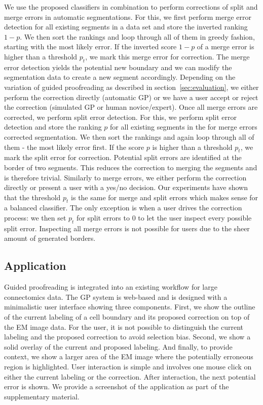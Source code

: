 We use the proposed classifiers in combination to perform corrections of split and merge errors in automatic segmentations. For this, we first perform merge error detection for all existing segments in a data set and store the inverted ranking $1-p$. We then sort the rankings and loop through all of them in greedy fashion, starting with the most likely error. If the inverted score $1-p$ of a merge error is higher than a threshold $p_t$, we mark this merge error for correction. The merge error detection yields the potential new boundary and we can modify the segmentation data to create a new segment accordingly. Depending on the variation of guided proofreading as described in section~\ref{sec:evaluation}, we either perform the correction directly (automatic GP) or we have a user accept or reject the correction (simulated GP or human novice/expert).
Once all merge errors are corrected, we perform split error detection. For this, we perform split error detection and store the ranking $p$ for all existing segments in the for merge errors corrected segmentation. We then sort the rankings and again loop through all of them - the most likely error first. If the score $p$ is higher than a threshold $p_t$, we mark the split error for correction. Potential split errors are identified at the border of two segments. This reduces the correction to merging the segments and is therefore trivial. Similarly to merge errors, we either perform the correction directly or present a user with a yes/no decision. Our experiments have shown that the threshold $p_t$ is the same for merge and split errors which makes sense for a balanced classifier. The only exception is when a user drives the correction process: we then set $p_t$ for split errors to 0 to let the user inspect every possible split error. Inspecting all merge errors is not possible for users due to the sheer amount of generated borders.

\subsection{Application}

Guided proofreading is integrated into an existing workflow for large connectomics data. The GP system is web-based and is designed with a minimalistic user interface showing three components. First, we show the outline of the current labeling of a cell boundary and its proposed correction on top of the EM image data. For the user, it is not possible to distinguish the current labeling and the proposed correction to avoid selection bias. Second, we show a solid overlay of the current and proposed labeling. And finally, to provide context, we show a larger area of the EM image where the potentially erroneous region is highlighted. User interaction is simple and involves one mouse click on either the current labeling or the correction. After interaction, the next potential error is shown. We provide a screenshot of the application as part of the supplementary material.

